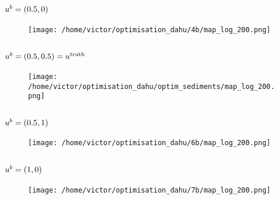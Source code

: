 \documentclass[../../Main_ManuscritThese.tex]{subfiles}
\begin{document}
\subsection*{$u^b=(0.5, 0)$}
\begin{figure}[ht]
  \centering
  \texttt{[image: /home/victor/optimisation\_dahu/4b/map\_log\_200.png]}
\end{figure}
\begin{figure}[ht]
  \centering
  \resizebox{1\textwidth}{!}{}
\end{figure}
\clearpage
\subsection*{$u^b=(0.5, 0.5) = u^{\mathrm{truth}}$}
\label{sec:appendix_truth_optim}
\begin{figure}[ht]
  \centering
  \texttt{[image: /home/victor/optimisation\_dahu/optim\_sediments/map\_log\_200.png]}
\end{figure}
\begin{figure}[ht]
  \centering
    \resizebox{1\textwidth}{!}{}
\end{figure}
\clearpage
\subsection*{$u^b=(0.5, 1)$}
\begin{figure}[ht]
  \centering
  \texttt{[image: /home/victor/optimisation\_dahu/6b/map\_log\_200.png]}
\end{figure}
\begin{figure}[ht]
  \centering
    \resizebox{1\textwidth}{!}{}
\end{figure}
\clearpage
\subsection*{$u^b=(1, 0)$}

\begin{figure}[ht]
  \centering
  \texttt{[image: /home/victor/optimisation\_dahu/7b/map\_log\_200.png]}
\end{figure}
\begin{figure}[ht]
  \centering
  \resizebox{1\textwidth}{!}{}
\end{figure}
\clearpage
\end{document}
